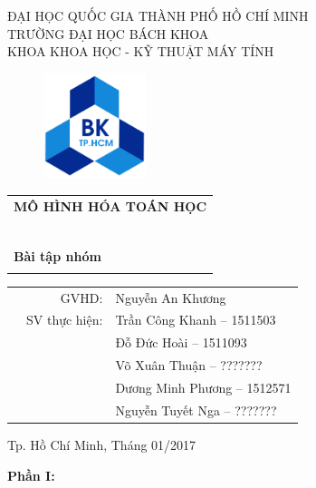 \documentclass[a4paper]{article}
\begin{document}
\begin{titlepage}
\begin{center}
ĐẠI HỌC QUỐC GIA THÀNH PHỐ HỒ CHÍ MINH \\
TRƯỜNG ĐẠI HỌC BÁCH KHOA \\
KHOA KHOA HỌC - KỸ THUẬT MÁY TÍNH 
\end{center}

\vspace{1cm}

\begin{figure}[h!]
\begin{center}
\includegraphics[width=3cm]{Images/hcmut.png}
\end{center}
\end{figure}

\vspace{1cm}


\begin{center}
\begin{tabular}{c}
\multicolumn{1}{l}{\textbf{{\Large\hspace{1 cm} MÔ HÌNH HÓA TOÁN HỌC\hspace{1 cm} }}}\\
~~\\
\hline
\\
\multicolumn{1}{l}{\textbf{{\Huge\hspace{1.7 cm} Bài tập nhóm}}}\\
\\
\hline
\end{tabular}
\end{center}

\vspace{1.5cm}

\begin{table}[h]
\begin{tabular}{rrl}
\hspace{5 cm} & GVHD: & Nguyễn An Khương\\

& SV thực hiện: & Trần Công Khanh -- 1511503 \\
& & Đỗ Đức Hoài -- 1511093 \\
& & Võ Xuân Thuận -- ??????? \\
& & Dương Minh Phương -- 1512571 \\
& & Nguyễn Tuyết Nga -- ??????? \\
\end{tabular}
\end{table}
\vspace{1.5cm}
\begin{center}
{\footnotesize Tp. Hồ Chí Minh, Tháng 01/2017}
\end{center}
\end{titlepage}
\newpage
\textbf{{\Large Phần I: }}\\
\end{document}
